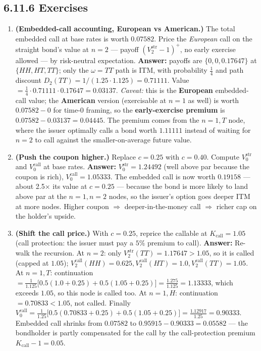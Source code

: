 \documentclass[
  10pt,
  twoside]{book}
\begin{document}
\subsection{6.11.6 Exercises}\label{exercises-37}

\begin{enumerate}
\def\labelenumi{\arabic{enumi}.}
\item
  \textbf{(Embedded-call accounting, European vs American.)} The total
  embedded call at base rates is worth \(0.07582\). Price the
  \emph{European} call on the straight bond's value at \(n = 2\) ---
  payoff \((V_2^{\text{str}} - 1)^+\), no early exercise allowed --- by
  risk-neutral expectation. \textbf{Answer:} payoffs are
  \(\{0, 0, 0.17647\}\) at \(\{HH, HT, TT\}\); only the \(\omega = TT\)
  path is ITM, with probability \(\tfrac{1}{4}\) and path discount
  \(D_2(TT) = 1/(1.25 \cdot 1.125) = 0.71111\). Value
  \(= \tfrac{1}{4} \cdot 0.71111 \cdot 0.17647 = 0.03137\).
  \emph{Caveat:} this is the \textbf{European} embedded-call value; the
  \textbf{American} version (exercisable at \(n = 1\) as well) is worth
  \(0.07582 - 0\) for time-0 framing, so the \textbf{early-exercise
  premium} is \(0.07582 - 0.03137 = 0.04445\). The premium comes from
  the \(n = 1, T\) node, where the issuer optimally calls a bond worth
  \(1.11111\) instead of waiting for \(n = 2\) to call against the
  smaller-on-average future value.
\item
  \textbf{(Push the coupon higher.)} Replace \(c = 0.25\) with
  \(c = 0.40\). Compute \(V_0^{\text{str}}\) and \(V_0^{\text{call}}\)
  at base rates. \textbf{Answer:} \(V_0^{\text{str}} = 1.24492\) (well
  above par because the coupon is rich),
  \(V_0^{\text{call}} = 1.05333\). The embedded call is now worth
  \(0.19158\) --- about 2.5× its value at \(c = 0.25\) --- because the
  bond is more likely to land above par at the \(n = 1, n = 2\) nodes,
  so the issuer's option goes deeper ITM at more nodes. Higher coupon
  \(\Rightarrow\) deeper-in-the-money call \(\Rightarrow\) richer cap on
  the holder's upside.
\item
  \textbf{(Shift the call price.)} With \(c = 0.25\), reprice the
  callable at \(K_{\text{call}} = 1.05\) (call protection: the issuer
  must pay a \(5\%\) premium to call). \textbf{Answer:} Re-walk the
  recursion. At \(n = 2\): only
  \(V_2^{\text{str}}(TT) = 1.17647 > 1.05\), so it is called (capped at
  \(1.05\));
  \(V_2^{\text{call}}(HH) = 0.625, V_2^{\text{call}}(HT) = 1.0, V_2^{\text{call}}(TT) = 1.05\).
  At \(n = 1, T\): continuation
  \(= \tfrac{1}{1.125}\bigl[0.5(1.0 + 0.25) + 0.5(1.05 + 0.25)\bigr] = \tfrac{1.275}{1.125} = 1.13333\),
  which exceeds \(1.05\), so this node is called too. At \(n = 1, H\):
  continuation \(= 0.70833 < 1.05\), not called. Finally
  \(V_0^{\text{call}} = \tfrac{1}{1.25}\bigl[0.5(0.70833 + 0.25) + 0.5(1.05 + 0.25)\bigr] = \tfrac{1.12917}{1.25} = 0.90333\).
  Embedded call shrinks from \(0.07582\) to
  \(0.95915 - 0.90333 = 0.05582\) --- the bondholder is partly
  compensated for the call by the call-protection premium
  \(K_{\text{call}} - 1 = 0.05\).
\end{enumerate}
\end{document}
